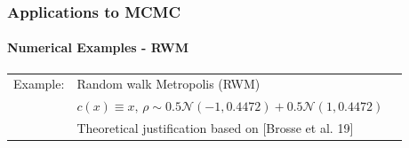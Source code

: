 \documentclass[xcolor=dvipsnames, subsection=false]{beamer}
\def\alertb#1{\alert{\color{BrickRed}  #1}}
\def\alertb#1{\alert{\color{BrickRed}  #1}}
\def\normal{\mathcal{N}}
\newcommand{\pr}{\rho}
\def\bl#1{{\color{blue}#1}}
\begin{document}
\begin{frame}
\frametitle{Applications to MCMC}
\framesubtitle{Numerical Examples - RWM}
\begin{tabular}{lll}\alertb{Example:}   & Random walk Metropolis (RWM)
	\\ & $c(x) \equiv x, \, \pr \sim 0.5 \normal(-1, 0.4472) + 0.5 \normal(1, 0.4472)$
	\\ & Theoretical justification based on {\footnotesize \bl{[Brosse et al. 19]}}
\end{tabular}\\[-1.5em]
\begin{figure}
\centering
 \mbox{
} 
\end{figure}
\end{frame}

%
\end{document}
